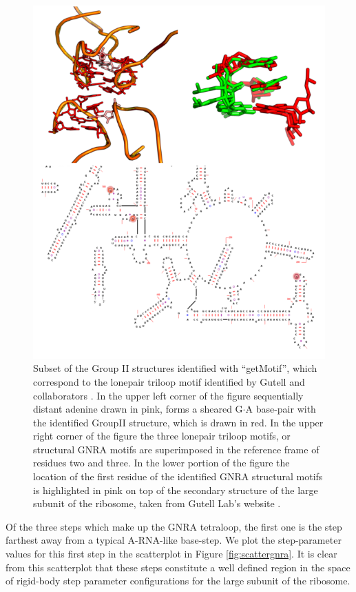 \begin{figure}
\centering 
\includegraphics[angle=0, scale=2.5]{Chapter5/lonepairtlooptert.png}
\caption{Subset   of   the  Group   II   structures  identified   with
  ``getMotif'',  which  correspond   to  the  lonepair  triloop  motif
  identified by Gutell and collaborators \cite{lee2003}.  In the upper
  left  corner of  the figure  sequentially distant  adenine  drawn in
  pink,  forms  a  sheared  G$\cdot$A base-pair  with  the  identified
  GroupII structure, which is drawn in red.  In the upper right corner
  of the figure the three  lonepair triloop motifs, or structural GNRA
  motifs are superimposed  in the reference frame of  residues two and
  three. In the lower portion of  the figure the location of the first
  residue of  the identified GNRA structural motifs  is highlighted in
  pink on top  of the secondary structure of the  large subunit of the
  ribosome, taken from Gutell Lab's website \cite{cannone2002}.  }
\label{fig:terts}
\end{figure}

Of the three steps which make  up the GNRA tetraloop, the first one is
the step farthest  away from a typical A-RNA-like  base-step.  We plot
the step-parameter  values for this  first step in the  scatterplot in
Figure \ref{fig:scattergnra}.  It is clear from  this scatterplot that
these  steps  constitute  a  well  defined  region  in  the  space  of
rigid-body step parameter configurations  for the large subunit of the
ribosome.

